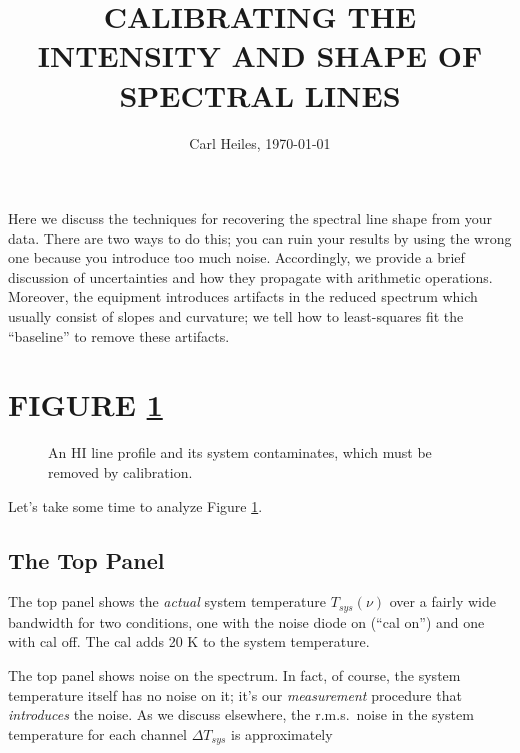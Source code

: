 
 
\def\simlt{\lower.5ex\hbox{$\; \buildrel < \over \sim \;$}}
\def\simgt{\lower.5ex\hbox{$\; \buildrel > \over \sim \;$}}


\title {CALIBRATING THE INTENSITY AND SHAPE OF SPECTRAL LINES}

\author{Carl Heiles, \today}

\tableofcontents

	Here we discuss the techniques for recovering the spectral line
shape from your data. There are two ways to do this; you can ruin your
results by using the wrong one because you introduce too much noise.
Accordingly, we provide a brief discussion of uncertainties and how they
propagate with arithmetic operations. Moreover, the equipment 
introduces artifacts in the reduced spectrum which usually consist of
slopes and curvature; we tell how to least-squares fit the ``baseline''
to remove these artifacts.

\section{FIGURE \ref{bumpmountain_cal}}

\begin{figure}[p!]
\begin{center}
\leavevmode
\epsfxsize=5in
\end{center}

\caption{ An HI line profile and its system contaminates, which must be
removed by calibration. \label{bumpmountain_cal}}

\end{figure}

	Let's take some time to analyze Figure \ref{bumpmountain_cal}.

\subsection{The Top Panel}

	The top panel shows the {\it actual} system temperature
$T_{sys}(\nu)$ over a fairly wide bandwidth for two conditions, one with
the noise diode on (``cal on'') and one with cal off. The cal adds 20 K
to the system temperature.

	The top panel shows noise on the spectrum. In fact, of course,
the system temperature itself has no noise on it; it's our {\it
measurement} procedure that {\it introduces} the noise. As we discuss
elsewhere, the r.m.s.\ noise in the system temperature for each channel
$\Delta T_{sys}$ is approximately

